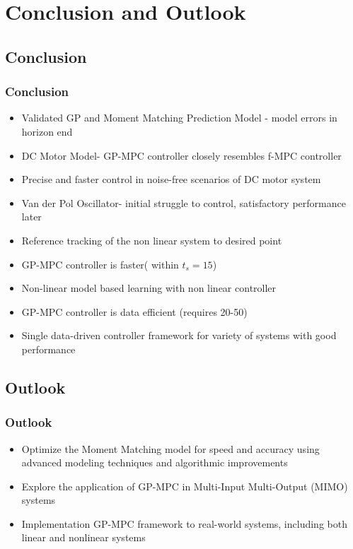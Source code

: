\section{Conclusion and Outlook}

\subsection{Conclusion}
    \begin{frame} \frametitle{Conclusion}
    \begin{itemize}
        \item Validated GP and Moment Matching Prediction Model - model errors in horizon end 
        \item DC Motor Model- GP-MPC controller closely resembles f-MPC controller
        \item Precise and faster control in noise-free scenarios of DC motor system
        \item Van der Pol Oscillator- initial struggle to control, satisfactory performance later
        \item Reference tracking of the non linear system to desired point
        \item GP-MPC controller is faster( within $t_s=15$) 
        \item Non-linear model based learning with non linear controller
        \item GP-MPC controller is data efficient (requires 20-50)
        \item Single data-driven controller framework for variety of systems with good performance 
    \end{itemize}
    \end{frame}

\subsection{Outlook}
    \begin{frame}
        \frametitle{Outlook}
\begin{itemize}
    \item Optimize the Moment Matching model for speed and accuracy using advanced modeling techniques and algorithmic improvements
    \item Explore the application of GP-MPC in Multi-Input Multi-Output (MIMO) systems
    \item Implementation GP-MPC framework to real-world systems, including both linear and nonlinear systems
\end{itemize}
    \end{frame}